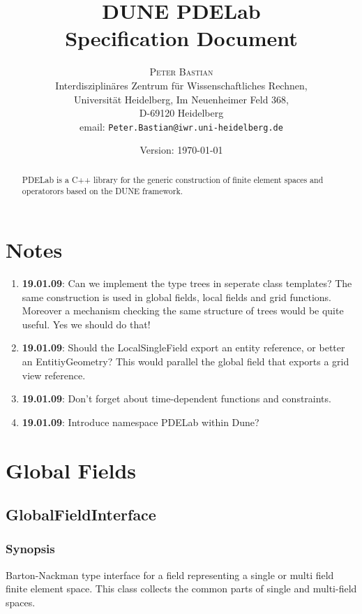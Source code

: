 \documentclass[11pt,a4paper,DIV11,%
notitlepage,oneside,abstracton,%
bibtotoc]{scrartcl}
\title{DUNE PDELab\\
Specification Document}
\author{\textsc{Peter Bastian}\\
Interdisziplinäres Zentrum für Wissenschaftliches Rechnen,\\
 Universität Heidelberg, Im Neuenheimer Feld 368, \\
D-69120 Heidelberg\\
email: \texttt{Peter.Bastian@iwr.uni-heidelberg.de}
}
\date{Version: \today}
\begin{document}
\maketitle

\begin{abstract}
PDELab is a C++ library for the generic construction of finite element
spaces and operatorors based on the DUNE framework.
\end{abstract}

\cleardoublepage
\tableofcontents

\cleardoublepage
\section{Notes}

\begin{enumerate}[1)]
\item \textbf{19.01.09}: Can we implement the type trees in seperate
  class templates? The
  same construction is used in global fields, local fields and grid
  functions. Moreover a mechanism checking the same structure of trees
  would be quite useful. Yes we should do that!
\item \textbf{19.01.09}: Should the LocalSingleField export an entity
  reference, or better an EntitiyGeometry? 
  This would parallel the global field that exports a grid
  view reference.
\item \textbf{19.01.09}: Don't forget about time-dependent functions
  and constraints.
\item \textbf{19.01.09}: Introduce namespace PDELab within Dune?
\end{enumerate}

\section{Global Fields}

\subsection{GlobalFieldInterface}

\subsubsection{Synopsis}

Barton-Nackman type interface for a field representing a single or
multi field finite element space. This class collects the common parts
of single and multi-field spaces.
\end{document}
